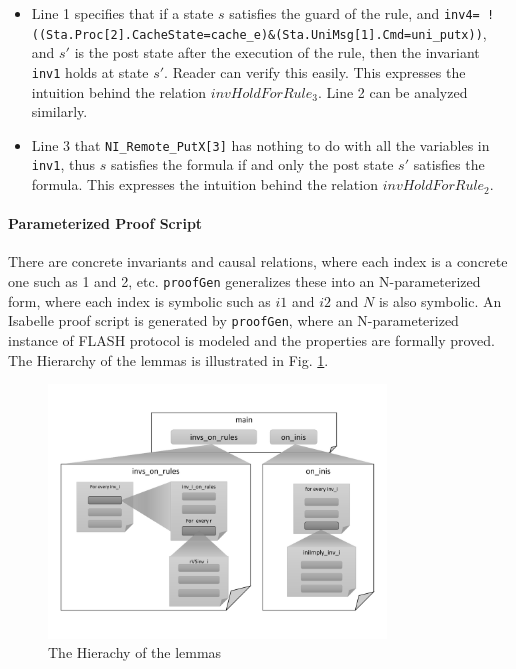 \documentclass{llncs}
\begin{document}
\begin{itemize}[noitemsep,nolistsep]
\item Line 1 specifies that if a state $s$ satisfies the guard of the rule, and %
  {\tt inv4= !((Sta.Proc[2].CacheState=cache\_e)\&(Sta.UniMsg[1].Cmd=uni\_putx))}, and $s'$ is the post state after the execution of the rule, then the invariant {\tt inv1} holds at state $s'$. Reader can verify this easily. This expresses the intuition behind the  relation $invHoldForRule_3$. Line 2 can be analyzed similarly.
 \item Line 3 that {\tt NI\_Remote\_PutX[3]} has nothing to do with all the variables in {\tt inv1}, thus $s$ satisfies the formula if and only the post state   $s'$ satisfies the formula. This expresses the intuition behind the   relation $invHoldForRule_2$.
\end{itemize}%

\vspace{-10pt}
\paragraph{Parameterized Proof Script} There are concrete invariants and causal relations, where each  index is a concrete one such as 1 and 2, etc. {\tt proofGen} generalizes these into an N-parameterized form, where each index is symbolic such as $i1$ and $i2$ and $N$ is also symbolic. An Isabelle proof script is  generated by {\tt proofGen}, where an N-parameterized instance of FLASH protocol is modeled   and the properties are formally proved. The Hierarchy of the lemmas is illustrated in Fig. \ref{fig:lemmaHierachy}. %



\begin{figure}[htbp]
\centering %


\includegraphics[width=0.8\textwidth]{thy.pdf}
\vspace{-20pt}
\caption{The Hierachy of the lemmas\label{fig:lemmaHierachy}
}
\end{figure}
\end{document}
